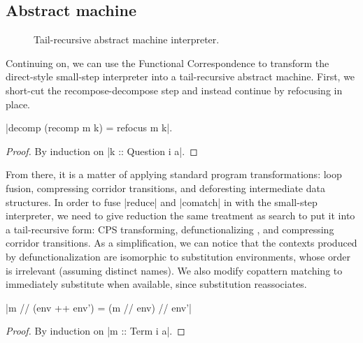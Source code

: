 \documentclass[sigplan,screen]{acmart}
\begin{document}
\subsection{Abstract machine}

\begin{figure}
\centering
{}
\caption{Tail-recursive abstract machine interpreter.}
\label{fig:block-machine-code}
\end{figure}

Continuing on, we can use the Functional Correspondence to transform the
direct-style small-step interpreter into a tail-recursive abstract machine.
First, we short-cut the recompose-decompose step and instead continue by
refocusing in place.
\begin{lemma}
  \label{thm:block-refocusing}

  \hs|decomp (recomp m k) = refocus m k|.
\end{lemma}
\begin{proof}
  By induction on \hs|k :: Question i a|.
\end{proof}
From there, it is a matter of applying standard program transformations: loop
fusion, compressing corridor transitions, and deforesting intermediate data
structures.  In order to fuse \hs|reduce| and \hs|comatch| in with the
small-step interpreter, we need to give reduction the same treatment as search
to put it into a tail-recursive form: CPS transforming, defunctionalizing
\cite{DefinitionalInterpreters}, and compressing corridor transitions.  As a
simplification, we can notice that the contexts produced by defunctionalization
are isomorphic to substitution environments, whose order is irrelevant (assuming
distinct names).  We also modify copattern matching to immediately substitute
when available, since substitution reassociates.
\begin{lemma}
  \label{thm:block-subst-reassoc}
  \hs|m // (env ++ env') = (m // env) // env'|
\end{lemma}
\begin{proof}
  By induction on \hs|m :: Term i a|.
\end{proof}
\end{document}

